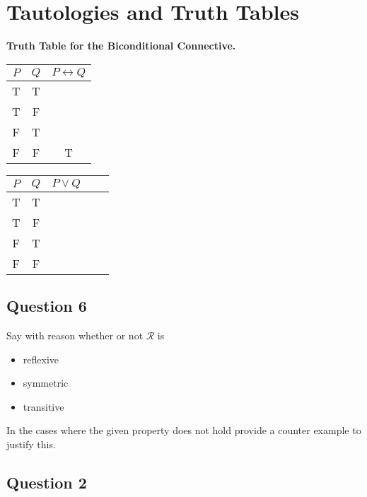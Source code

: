 \documentclass[]{report}
\begin{document}
\section{Tautologies and Truth Tables}
\textbf{Truth Table for the Biconditional Connective.} \bigskip
\begin{center}
	\begin{tabular}{|c|c|c|}
		\hline $P$  & $Q$ & $P \leftrightarrow Q$ \\ \hline
		\hline T & T &   \\ 
		\hline T & F &    \\ 
		\hline F & T &    \\ 
		\hline \phantom{sp}F \phantom{sp} & \phantom{sp}F \phantom{sp} & \phantom{sp}T \phantom{sp} \\
		\hline 
	\end{tabular} 
\end{center}

\begin{tabular}{|c|c|c|c|c|}
	\hline $P$ & $Q$ & $P \vee Q$ &  &  \\ \hline
	\hline T & T &  &  &  \\ 
	\hline T & F &  &  &  \\ 
	\hline F & T &  &  &  \\ 
	\hline \phantom{sp}F \phantom{sp} & \phantom{sp}F \phantom{sp} & \phantom{spacespa} & \phantom{spacespa}  & \phantom{spacespa} \\ 
	
	\hline 
\end{tabular} 

\newpage

\subsection{Question 6}
Say with reason whether or not $\mathcal{R}$ is
\begin{itemize}
	\item reflexive
	\item symmetric
	\item transitive
\end{itemize}

In the cases where the given property does not hold provide a counter example to justify this.


\subsection*{Question 2}
\end{document}
